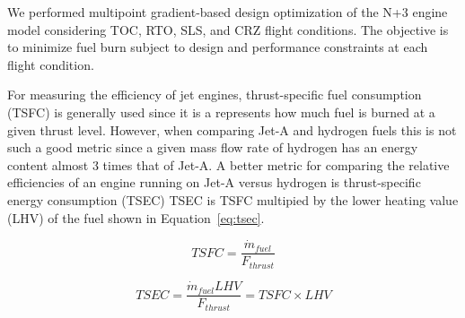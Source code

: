 \documentclass[conf]{new-aiaa}
\begin{document}
We performed multipoint gradient-based design optimization of the N+3 engine model considering TOC, RTO, SLS, and CRZ flight conditions.
The objective is to minimize fuel burn subject to design and performance constraints at each flight condition.

For measuring the efficiency of jet engines, thrust-specific fuel consumption (TSFC) is generally used since it is a represents how much fuel is burned at a given thrust level.
However, when comparing Jet-A and hydrogen fuels this is not such a good metric since a given mass flow rate of hydrogen has an energy content almost 3 times that of Jet-A.
A better metric for comparing the relative efficiencies of an engine running on Jet-A versus hydrogen is thrust-specific energy consumption (TSEC) %
TSEC is TSFC multipied by the lower heating value (LHV) of the fuel shown in Equation~\eqref{eq:tsec}.

\begin{equation}
    TSFC = \frac{\Dot{m}_{fuel}}{F_{thrust}}
    \label{eq:tsfc}
\end{equation}

\begin{equation}
    TSEC = \frac{\Dot{m}_{fuel} LHV}{F_{thrust}} = TSFC \times LHV
    \label{eq:tsec}
\end{equation}
\end{document}
